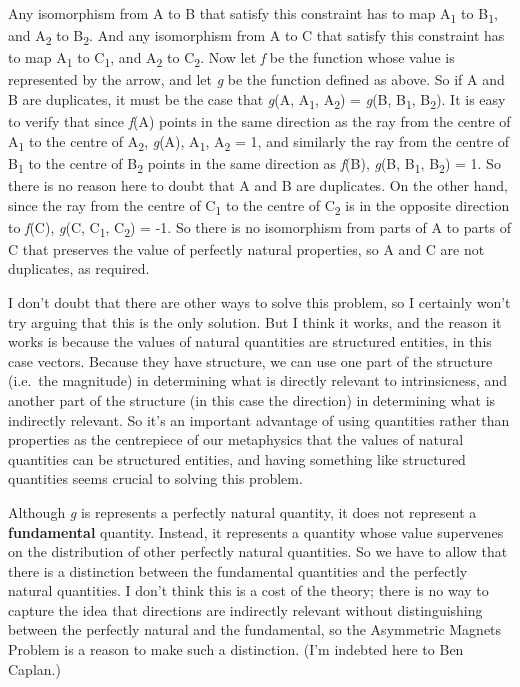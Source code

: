 \documentclass[
  10pt,
  letterpaper,
  DIV=11,
  numbers=noendperiod,
  twoside]{scrartcl}
\begin{document}
Any isomorphism from A to B that satisfy this constraint has to map
A\textsubscript{1} to B\textsubscript{1}, and A\textsubscript{2} to
B\textsubscript{2}. And any isomorphism from A to C that satisfy this
constraint has to map A\textsubscript{1} to C\textsubscript{1}, and
A\textsubscript{2} to C\textsubscript{2}. Now let \emph{f} be the
function whose value is represented by the arrow, and let \emph{g} be
the function defined as above. So if A and B are duplicates, it must be
the case that \emph{g}(A, A\textsubscript{1}, A\textsubscript{2}) =
\emph{g}(B, B\textsubscript{1}, B\textsubscript{2}). It is easy to
verify that since \emph{f}(A) points in the same direction as the ray
from the centre of A\textsubscript{1} to the centre of
A\textsubscript{2}, \emph{g}(A), A\textsubscript{1}, A\textsubscript{2}
= 1, and similarly the ray from the centre of B\textsubscript{1} to the
centre of B\textsubscript{2} points in the same direction as
\emph{f}(B), \emph{g}(B, B\textsubscript{1}, B\textsubscript{2}) = 1. So
there is no reason here to doubt that A and B are duplicates. On the
other hand, since the ray from the centre of C\textsubscript{1} to the
centre of C\textsubscript{2} is in the opposite direction to
\emph{f}(C), \emph{g}(C, C\textsubscript{1}, C\textsubscript{2}) = -1.
So there is no isomorphism from parts of A to parts of C that preserves
the value of perfectly natural properties, so A and C are not
duplicates, as required.

I don't doubt that there are other ways to solve this problem, so I
certainly won't try arguing that this is the only solution. But I think
it works, and the reason it works is because the values of natural
quantities are structured entities, in this case vectors. Because they
have structure, we can use one part of the structure (i.e.~the
magnitude) in determining what is directly relevant to intrinsicness,
and another part of the structure (in this case the direction) in
determining what is indirectly relevant. So it's an important advantage
of using quantities rather than properties as the centrepiece of our
metaphysics that the values of natural quantities can be structured
entities, and having something like structured quantities seems crucial
to solving this problem.

Although \emph{g} is represents a perfectly natural quantity, it does
not represent a \textbf{fundamental} quantity. Instead, it represents a
quantity whose value supervenes on the distribution of other perfectly
natural quantities. So we have to allow that there is a distinction
between the fundamental quantities and the perfectly natural quantities.
I don't think this is a cost of the theory; there is no way to capture
the idea that directions are indirectly relevant without distinguishing
between the perfectly natural and the fundamental, so the Asymmetric
Magnets Problem is a reason to make such a distinction. (I'm indebted
here to Ben Caplan.)
\end{document}
